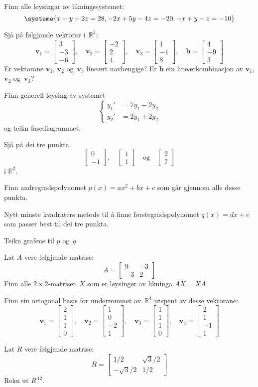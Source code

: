 \documentclass[titlepage,a4paper,12pt,nynorsk]{IMFeksamen}
\newcommand{\R}{\mathbb{R}}
\newcommand{\V}[1]{\mathbf{#1}}
\newcommand{\vv}[2]{\begin{bmatrix} #1 \\ #2 \end{bmatrix}}
\newcommand{\vvv}[3]{\begin{bmatrix} #1 \\ #2 \\ #3 \end{bmatrix}}
\newcommand{\vvvv}[4]{\begin{bmatrix} #1 \\ #2 \\ #3 \\ #4 \end{bmatrix}}
\renewcommand{\v}{\V{v}}
\renewcommand{\b}{\V{b}}
\newcommand{\0}{\V{0}}
\begin{document}
\begin{oppgave}
Finn alle løysingar av likningssystemet:
\[
\systeme{
x - y + 2z = 28,
-2x + 5y - 4z = -20,
-x + y - z = -10
}
\]
\end{oppgave}


\begin{oppgave}
Sjå på følgjande vektorar i~$\R^3$:
\[
\v_1 = \vvv{3}{-3}{-6},\quad
\v_2 = \vvv{-2}{2}{4},\quad
\v_3 = \vvv{1}{-1}{8},\quad
\b = \vvv{4}{-9}{3}
\]
Er vektorane $\v_1$, $\v_2$ og~$\v_3$ lineært uavhengige?
Er $\b$ ein lineærkombinasjon av $\v_1$, $\v_2$ og~$\v_3$?
\end{oppgave}


\begin{oppgave}
Finn generell løysing av systemet
\[
\left\{
\begin{aligned}
y_1' &= 7 y_1 - 2 y_2 \\
y_2' &= 2 y_1 + 2 y_2
\end{aligned}
\right.
\]
og teikn fasediagrammet.
\end{oppgave}


\begin{oppgave}
Sjå på dei tre punkta
\[
\vv{0}{-1},\quad
\vv{1}{1}\quad\text{og}\quad
\vv{2}{7}
\]
i $\R^2$.

Finn andregradspolynomet
$p(x) = ax^2 + bx + c$
som går gjennom alle desse punkta.

Nytt minste kvadraters metode til å finne førstegradspolynomet
$q(x) = dx + e$
som passer best til dei tre punkta.

Teikn grafene til $p$ og~$q$.
\end{oppgave}


\begin{oppgave}
Lat $A$ vere følgjande matrise:
\[
A =
\begin{bmatrix}
 9 & -3 \\
-3 &  2
\end{bmatrix}
\]
Finn alle $2 \times 2$-matriser~$X$ som er løysinger av likninga
$AX = XA$.
\end{oppgave}


\begin{oppgave}
Finn ein ortogonal basis for underrommet av~$\R^4$ utspent av
desse vektorane:
\[
\v_1 = \vvvv{2}{1}{1}{0},\quad
\v_2 = \vvvv{1}{0}{-2}{1},\quad
\v_3 = \vvvv{1}{1}{1}{0},\quad
\v_4 = \vvvv{2}{1}{-1}{1}
\]
\end{oppgave}


\begin{oppgave}
Lat $R$ vere følgjande matrise:
\[
R =
\begin{bmatrix}
        1/2 & \sqrt{3}/2 \\
-\sqrt{3}/2 &        1/2
\end{bmatrix}
\]
Rekn ut $R^{\,42}$.
\end{oppgave}
\end{document}
